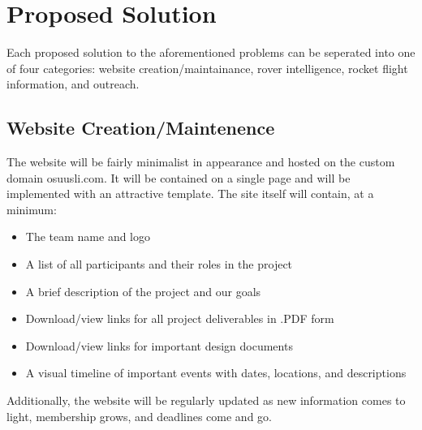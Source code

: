 \documentclass[onecolumn, draftclsnofoot,10pt, compsoc]{IEEEtran}
\begin{document}
\section{Proposed Solution}
Each proposed solution to the aforementioned problems can be seperated into one of four categories: website creation/maintainance, rover intelligence, rocket flight information, and outreach.
\subsection{Website Creation/Maintenence}
The website will be fairly minimalist in appearance and hosted on the custom domain osuusli.com. It will be contained on a single page and will be implemented with an attractive template. The site itself will contain, at a minimum:
\begin{itemize}
\item The team name and logo
\item A list of all participants and their roles in the project
\item A brief description of the project and our goals
\item Download/view links for all project deliverables in .PDF form
\item Download/view links for important design documents
\item A visual timeline of important events with dates, locations, and descriptions
\end{itemize}
\par Additionally, the website will be regularly updated as new information comes to light, membership grows, and deadlines come and go.
\end{document}
